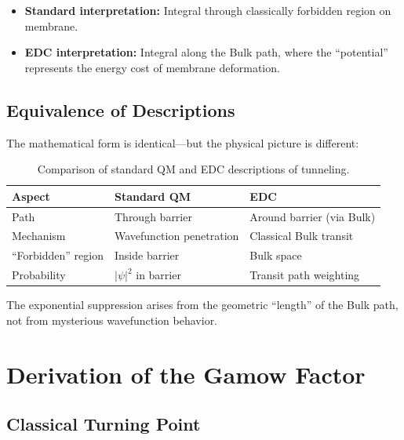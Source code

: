 \documentclass[12pt,a4paper]{article}
\begin{document}
\begin{itemize}
    \item \textbf{Standard interpretation:} Integral through classically forbidden region on membrane.
    \item \textbf{EDC interpretation:} Integral along the Bulk path, where the ``potential'' represents the energy cost of membrane deformation.
\end{itemize}

\subsection{Equivalence of Descriptions}

The mathematical form is identical---but the physical picture is different:

\begin{table}[H]
\centering
\begin{tabular}{@{}lll@{}}
\toprule
\textbf{Aspect} & \textbf{Standard QM} & \textbf{EDC} \\
\midrule
Path & Through barrier & Around barrier (via Bulk) \\
Mechanism & Wavefunction penetration & Classical Bulk transit \\
``Forbidden'' region & Inside barrier & Bulk space \\
Probability & $|\psi|^2$ in barrier & Transit path weighting \\
\bottomrule
\end{tabular}
\caption{Comparison of standard QM and EDC descriptions of tunneling.}
\end{table}

\begin{insight}
The exponential suppression arises from the geometric ``length'' of the Bulk path, not from mysterious wavefunction behavior.
\end{insight}

\section{Derivation of the Gamow Factor}

\subsection{Classical Turning Point}
\end{document}
